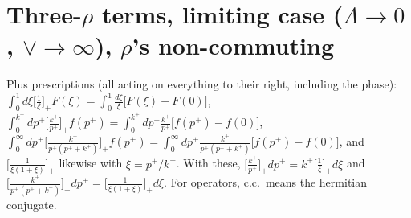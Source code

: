 \documentclass[10pt]{article}
\begin{document}
\section*{Three-$\rho$ terms, limiting case ($\Lambda\to0$, $\vee\to\infty$), $\rho$'s non-commuting}
Plus prescriptions (all acting on everything to their right, including the phase):
$\int_{0}^{1}d\xi\big[\frac1\xi\big]_{+}F(\xi)=\int_{0}^{1}\frac{d\xi}{\xi}\big[F(\xi)-F(0)\big]$,
$\int_{0}^{k^{+}}dp^{+}\big[\frac{k^{+}}{p^{+}}\big]_{+}f(p^{+})=\int_{0}^{k^{+}}dp^{+}\frac{k^{+}}{p^{+}}\big[f(p^{+})-f(0)\big]$,
$\int_{0}^{\infty}dp^{+}\big[\frac{k^{+}}{p^{+}(p^{+}+k^{+})}\big]_{+}f(p^{+})=\int_{0}^{\infty}dp^{+}\frac{k^{+}}{p^{+}(p^{+}+k^{+})}\big[f(p^{+})-f(0)\big]$,
and $\big[\frac{1}{\xi(1+\xi)}\big]_{+}$ likewise with $\xi=p^{+}/k^{+}$. With these, $\big[\frac{k^{+}}{p^{+}}\big]_{+}dp^{+}=k^{+}\big[\frac{1}{\xi}\big]_{+}d\xi$ and $\big[\frac{k^{+}}{p^{+}(p^{+}+k^{+})}\big]_{+}dp^{+}=\big[\frac{1}{\xi(1+\xi)}\big]_{+}d\xi$.
For operators, c.c.\ means the hermitian conjugate.
\end{document}

